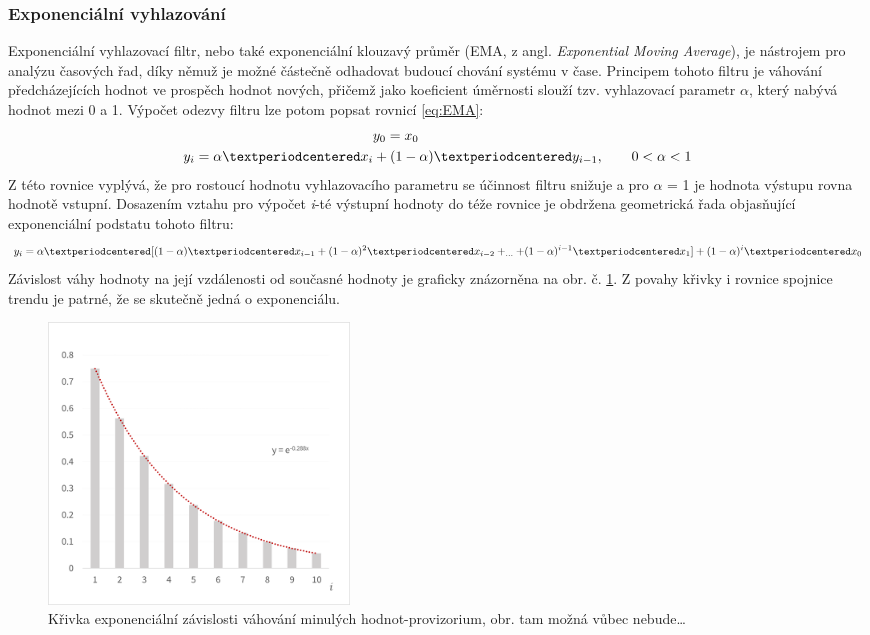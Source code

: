 \documentclass[a4paper, 12pt]{article}
\begin{document}
\subsubsection{Exponenciální vyhlazování}
\label{sec:filtr4}
Exponenciální vyhlazovací filtr, nebo také exponenciální klouzavý průměr (EMA, z angl. \textit{Exponential Moving Average}), je nástrojem pro analýzu časových řad, díky němuž je možné částečně odhadovat budoucí chování systému v čase. Principem tohoto filtru je váhování předcházejících hodnot ve prospěch hodnot nových, přičemž jako koeficient úměrnosti slouží tzv. vyhlazovací parametr $\alpha$, který nabývá hodnot mezi 0 a 1. Výpočet odezvy filtru lze potom popsat rovnicí \ref{eq:EMA}:
\begin{equation} \label{eq:EMA}
\begin{gathered}
    y_{0} = x_{0}\hspace{6em} \\
    y_{i} = \alpha·x_{i}+(1-\alpha)·y_{i-1},\qquad 0<\alpha<1
\end{gathered}
\vspace{0.25cm}
\end{equation}
Z této rovnice vyplývá, že pro rostoucí hodnotu vyhlazovacího parametru se účinnost filtru snižuje a pro $\alpha$ = 1 je hodnota výstupu rovna hodnotě vstupní. Dosazením vztahu pro výpočet \textit{i}-té výstupní hodnoty do téže rovnice je obdržena geometrická řada objasňující exponenciální podstatu tohoto filtru:
\begin{equation} \label{eq:EMAexp}
    y_{i} = \alpha·[(1-\alpha)·x_{i-1}+(1-\alpha)^{2}·x_{i-2}+_{\ldots}+(1-\alpha)^{i-1}·x_{1}]+(1-\alpha)^{i}·x_{0}
\vspace{0.25cm}
\end{equation}
Závislost váhy hodnoty na její vzdálenosti od současné hodnoty je graficky znázorněna na obr. č. \ref{fig:EMAexp}. Z povahy křivky i rovnice spojnice trendu je patrné, že se skutečně jedná o exponenciálu.

\begin{figure}[hbt!]
    \centering
    \includegraphics[width=8cm]{EMAexp.png}
    \caption{\tiny Křivka exponenciální závislosti váhování minulých hodnot-provizorium, obr. tam možná vůbec nebude\ldots}
    \label{fig:EMAexp}
\end{figure}
\end{document}
